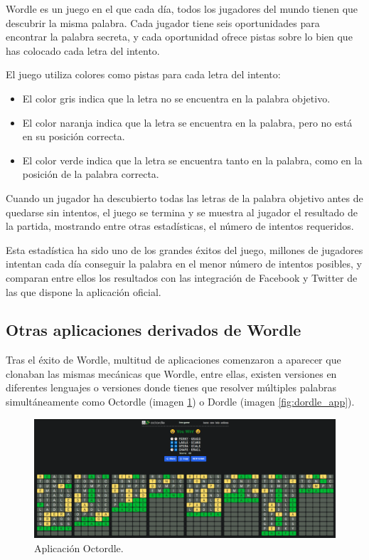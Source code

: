 Wordle es un juego en el que cada día, todos los jugadores del mundo tienen que descubrir la misma palabra.
Cada jugador tiene seis oportunidades para encontrar la palabra secreta, y cada oportunidad ofrece pistas sobre lo bien que has colocado cada letra del intento.

El juego utiliza colores como pistas para cada letra del intento:
\begin{itemize}
	\item El color gris indica que la letra no se encuentra en la palabra objetivo.
	\item El color naranja indica que la letra se encuentra en la palabra, pero no está en su posición correcta.
	\item El color verde indica que la letra se encuentra tanto en la palabra, como en la posición de la palabra correcta.
\end{itemize}

Cuando un jugador ha descubierto todas las letras de la palabra objetivo antes de quedarse sin intentos, el juego se termina y se muestra al jugador el resultado de la partida, mostrando entre otras estadísticas, el número de intentos requeridos.

Esta estadística ha sido uno de los grandes éxitos del juego, millones de jugadores intentan cada día conseguir la palabra en el menor número de intentos posibles, y comparan entre ellos los resultados con las integración de Facebook y Twitter de las que dispone la aplicación oficial.


\subsection{Otras aplicaciones derivados de Wordle}

Tras el éxito de Wordle, multitud de aplicaciones comenzaron a aparecer que clonaban las mismas mecánicas que Wordle, entre ellas, existen versiones en diferentes lenguajes o versiones donde tienes que resolver múltiples palabras simultáneamente como Octordle (imagen \ref{fig:octordle_app}) o Dordle (imagen \ref{fig:dordle_app}).


\begin{figure}
	\centering
	\includegraphics[clip=true,width=\textwidth]{images/octordle.png}
	\caption{Aplicación Octordle.}
	\label{fig:octordle_app}
\end{figure}

